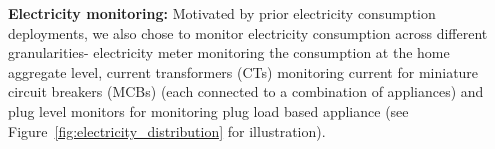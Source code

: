 \documentclass[10pt]{sensys-proc}
\newcommand{\figref}[1]{Figure~\ref{#1}}
\begin{document}
\noindent\textbf{Electricity monitoring:} %
Motivated by prior electricity consumption deployments, we also chose to monitor electricity consumption across different granularities- electricity meter monitoring the consumption at the home aggregate level, current transformers (CTs) monitoring current for miniature circuit breakers (MCBs) (each connected to a combination of appliances) and plug level monitors for monitoring plug load based appliance (see \figref{fig:electricity_distribution} for illustration). 
\end{document}

